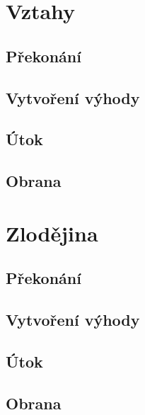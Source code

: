 \documentclass[../main.tex]{subfiles}
\begin{document}
\section{Vztahy}
\label{sec:vztahy}

\subsection*{Překonání}
\label{subsec:vztahy-prekonani}
\prekonani

\subsection*{Vytvoření výhody}
\label{subsec:vztahy-vytvoreni}
\vytvoreni

\subsection*{Útok}
\label{subsec:vztahy-utok}
\utok

\subsection*{Obrana}
\label{subsec:vztahy-obrana}
\obrana

\section{Zlodějina}
\label{sec:zlodejina}

\subsection*{Překonání}
\label{subsec:zlodejina-prekonani}
\prekonani

\subsection*{Vytvoření výhody}
\label{subsec:zlodejina-vytvoreni}
\vytvoreni

\subsection*{Útok}
\label{subsec:zlodejina-utok}
\utok

\subsection*{Obrana}
\label{subsec:zlodejina-obrana}
\obrana
\end{document}
